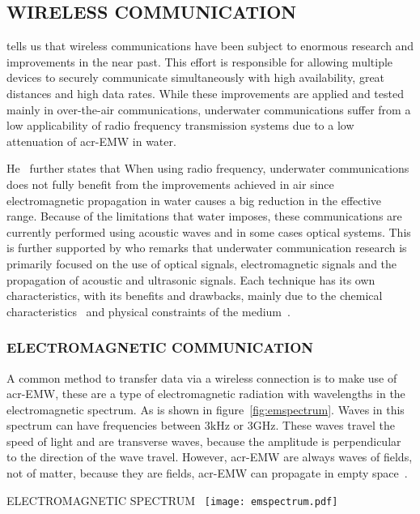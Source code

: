 \subsection{WIRELESS COMMUNICATION}
\citet{freitas_evaluation_2014} tells us that wireless communications have been subject to enormous research and improvements in the near past. This effort is  responsible for allowing multiple devices to securely communicate simultaneously with high availability, great distances and high data rates. While these improvements are applied and tested mainly in over-the-air communications, underwater communications suffer from a low applicability of radio frequency transmission systems due to a low attenuation of \gls{acr-EMW}  in water.

He~\cite{freitas_evaluation_2014} further states that When using radio frequency, underwater communications does not fully benefit from the improvements achieved in air since electromagnetic propagation in water causes a big reduction in the effective range. Because of the limitations that water imposes, these communications are currently performed using acoustic waves and in some cases optical systems. This is further supported by \citet{lloret_underwater_2012} who remarks that underwater communication research is primarily focused on the use of optical signals, electromagnetic signals and the propagation of acoustic and ultrasonic signals.
Each technique has its own characteristics, with its benefits and drawbacks, mainly due to the chemical characteristics~\cite{garcia_underwater_2011} and physical constraints of the medium~\cite{lanbo_prospects_2008}.

\subsubsection{ELECTROMAGNETIC COMMUNICATION}\label{sec:em}
A common method to transfer data via a wireless connection is to make use of \gls{acr-EMW}, these are a type of electromagnetic radiation with wavelengths in the electromagnetic spectrum. As is shown in figure~\ref{fig:emspectrum}. Waves in this spectrum can have frequencies between \( 3 \si{\kilo\hertz} \) or \( 3 \si{\giga\hertz} \).
These waves travel the speed of light and are transverse waves, because the amplitude is perpendicular to the direction of the wave travel. However, \gls{acr-EMW} are always waves of fields, not of matter, because they are fields, \gls{acr-EMW} can propagate in empty space~\cite{giancoli_physics_2015}.

\begin{RoyalFigure}[!htb, label=fig:emspectrum]{ELECTROMAGNETIC SPECTRUM~\cite{giancoli_physics_2015}}
   \texttt{[image: emspectrum.pdf]}
 \end{RoyalFigure}

